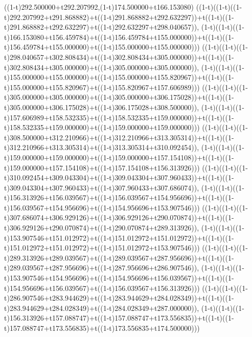((1-t)292.500000+t292.207992,(1-t)174.500000+t166.153080)
((1-t)((1-t)((1-t)292.207992+t291.868882)+t((1-t)291.868882+t292.632297))+t((1-t)((1-t)291.868882+t292.632297)+t((1-t)292.632297+t298.040657)),                                     (1-t)((1-t)((1-t)166.153080+t156.459784)+t((1-t)156.459784+t155.000000))+t((1-t)((1-t)156.459784+t155.000000)+t((1-t)155.000000+t155.000000)))
((1-t)((1-t)((1-t)298.040657+t302.808434)+t((1-t)302.808434+t305.000000))+t((1-t)((1-t)302.808434+t305.000000)+t((1-t)305.000000+t305.000000)),                                     (1-t)((1-t)((1-t)155.000000+t155.000000)+t((1-t)155.000000+t155.820967))+t((1-t)((1-t)155.000000+t155.820967)+t((1-t)155.820967+t157.606989)))
((1-t)((1-t)((1-t)305.000000+t305.000000)+t((1-t)305.000000+t306.175028))+t((1-t)((1-t)305.000000+t306.175028)+t((1-t)306.175028+t308.500000)),                                     (1-t)((1-t)((1-t)157.606989+t158.532335)+t((1-t)158.532335+t159.000000))+t((1-t)((1-t)158.532335+t159.000000)+t((1-t)159.000000+t159.000000)))
((1-t)((1-t)((1-t)308.500000+t312.210966)+t((1-t)312.210966+t313.305314))+t((1-t)((1-t)312.210966+t313.305314)+t((1-t)313.305314+t310.092454)),                                     (1-t)((1-t)((1-t)159.000000+t159.000000)+t((1-t)159.000000+t157.154108))+t((1-t)((1-t)159.000000+t157.154108)+t((1-t)157.154108+t156.313926)))
((1-t)((1-t)((1-t)310.092454+t309.043304)+t((1-t)309.043304+t307.960433))+t((1-t)((1-t)309.043304+t307.960433)+t((1-t)307.960433+t307.686074)),                                     (1-t)((1-t)((1-t)156.313926+t156.039567)+t((1-t)156.039567+t154.956696))+t((1-t)((1-t)156.039567+t154.956696)+t((1-t)154.956696+t153.907546)))
((1-t)((1-t)((1-t)307.686074+t306.929126)+t((1-t)306.929126+t290.070874))+t((1-t)((1-t)306.929126+t290.070874)+t((1-t)290.070874+t289.313926)),                                     (1-t)((1-t)((1-t)153.907546+t151.012972)+t((1-t)151.012972+t151.012972))+t((1-t)((1-t)151.012972+t151.012972)+t((1-t)151.012972+t153.907546)))
((1-t)((1-t)((1-t)289.313926+t289.039567)+t((1-t)289.039567+t287.956696))+t((1-t)((1-t)289.039567+t287.956696)+t((1-t)287.956696+t286.907546)),                                     (1-t)((1-t)((1-t)153.907546+t154.956696)+t((1-t)154.956696+t156.039567))+t((1-t)((1-t)154.956696+t156.039567)+t((1-t)156.039567+t156.313926)))
((1-t)((1-t)((1-t)286.907546+t283.944629)+t((1-t)283.944629+t284.028349))+t((1-t)((1-t)283.944629+t284.028349)+t((1-t)284.028349+t287.000000)),                                     (1-t)((1-t)((1-t)156.313926+t157.088747)+t((1-t)157.088747+t173.556835))+t((1-t)((1-t)157.088747+t173.556835)+t((1-t)173.556835+t174.500000)))
